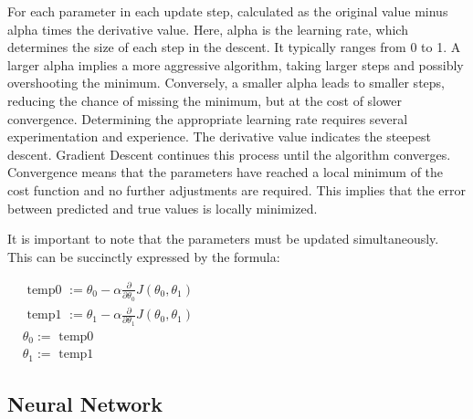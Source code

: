 \documentclass{article}
\begin{document}
    \hspace*{\fill}


    For each parameter in each update step, calculated as the original value minus alpha times the derivative value. Here, alpha is the learning rate, which determines the size of each step in the descent. It typically ranges from 0 to 1. A larger alpha implies a more aggressive algorithm, taking larger steps and possibly overshooting the minimum. Conversely, a smaller alpha leads to smaller steps, reducing the chance of missing the minimum, but at the cost of slower convergence. Determining the appropriate learning rate requires several experimentation and experience. The derivative value indicates the steepest descent. Gradient Descent continues this process until the algorithm converges. Convergence means that the parameters have reached a local minimum of the cost function and no further adjustments are required. This implies that the error between predicted and true values is locally minimized.

    It is important to note that the parameters must be updated simultaneously. This can be succinctly expressed by the formula:

     \hspace*{\fill}

     $\begin{aligned} & \text { temp0 }:=\theta_0-\alpha \frac{\partial}{\partial \theta_0} J\left(\theta_0, \theta_1\right) \\ & \text { temp1 }:=\theta_1-\alpha \frac{\partial}{\partial \theta_1} J\left(\theta_0, \theta_1\right) \\ & \theta_0:=\text { temp0 } \\ & \theta_1:=\text { temp1 }\end{aligned}$

     \hspace*{\fill}


     \newpage
	\subsection{Neural Network}
\end{document}
